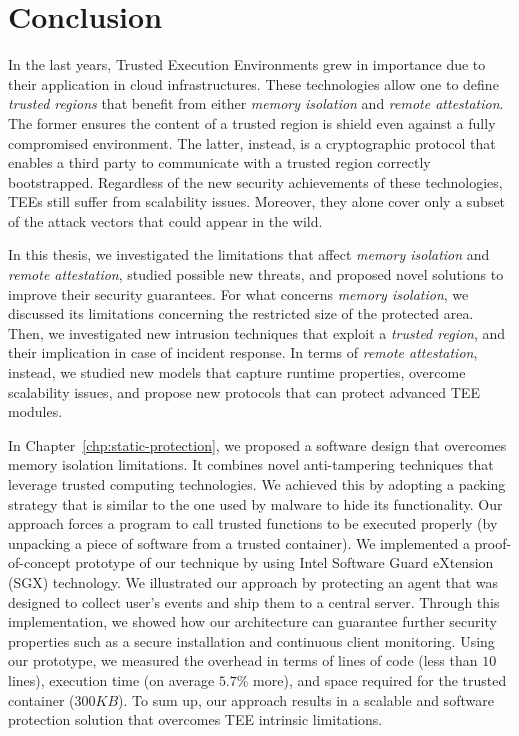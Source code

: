 \chapter{Conclusion}
\label{chp:conclusion}

In the last years, Trusted Execution Environments grew in importance due to 
their application in cloud infrastructures.
These technologies allow one to define \emph{trusted regions} that benefit from 
either \emph{memory isolation} and \emph{remote attestation}.
The former ensures the content of a trusted region is shield even against a 
fully compromised environment. 
The latter, instead, is a cryptographic protocol that enables a third party to 
communicate with a trusted region correctly bootstrapped. Regardless of the new 
security achievements of these technologies, TEEs still suffer from scalability 
issues. 
Moreover, they alone cover only a subset of the attack vectors that could 
appear in the wild.

In this thesis, we investigated the limitations that affect \emph{memory 
isolation} and \emph{remote attestation}, studied possible new threats, and 
proposed novel solutions to improve their security guarantees. For what 
concerns \emph{memory isolation}, we discussed its limitations concerning the 
restricted size of the protected area.
Then, we investigated new intrusion techniques that exploit a 
\emph{trusted region}, and their implication in case of incident response. 
In terms of \emph{remote attestation}, instead, we studied new models that 
capture runtime properties, overcome scalability issues, and propose new 
protocols that can protect advanced TEE modules.


In Chapter~\ref{chp:static-protection}, we proposed a software design that 
overcomes memory isolation limitations. It combines novel anti-tampering 
techniques that leverage trusted computing technologies.
We achieved this by adopting a packing strategy that is similar to the one used 
by malware to hide its functionality. 
Our approach forces a program to call trusted functions to be executed properly 
(by unpacking a piece of software from a trusted container). 
We implemented a proof-of-concept prototype of our technique by using Intel 
Software Guard eXtension (SGX) technology.
We illustrated our approach by protecting an agent that was designed to collect 
user’s events and ship them to a central server. 
Through this implementation, we showed how our architecture can guarantee 
further security properties such as a secure installation and continuous client 
monitoring. Using our prototype, we measured the overhead in terms of
lines of code (less than $10$ lines), execution time (on average $5.7\%$ more), 
and space required for the trusted container ($300KB$).
To sum up, our approach results in a scalable and software protection solution 
that overcomes TEE intrinsic limitations.


